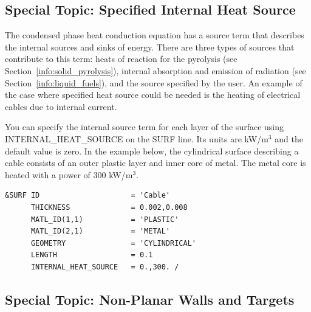 \documentclass[11pt]{book}
\begin{document}
\subsection{Special Topic: Specified Internal Heat Source}

\label{info:INTERNAL_HEAT_SOURCE}

The condensed phase heat conduction equation has a source term that describes the internal sources and sinks of energy.
There are three types of sources that contribute to this term:
heats of reaction for the pyrolysis (see Section~\ref{info:solid_pyrolysis}),
internal absorption and emission of radiation (see Section~\ref{info:liquid_fuels}), and the source specified by the user.
An example of the case where specified heat source could be needed is the heating of electrical cables due to internal current.

You can specify the internal source term for each layer of the surface using {\ct INTERNAL\_HEAT\_SOURCE} on the {\ct SURF} line.
Its units are {\si kW/m$^3$} and the default value is zero.
In the example below, the cylindrical surface describing a cable consists of an outer plastic layer and inner core of metal.
The metal core is heated with a power of 300 {\si kW/m$^3$}.
\begin{lstlisting}
&SURF ID                     = 'Cable'
      THICKNESS              = 0.002,0.008
      MATL_ID(1,1)           = 'PLASTIC'
      MATL_ID(2,1)           = 'METAL'
      GEOMETRY               = 'CYLINDRICAL'
      LENGTH                 = 0.1
      INTERNAL_HEAT_SOURCE   = 0.,300. /
\end{lstlisting}

\subsection{Special Topic: Non-Planar Walls and Targets}

\label{info:GEOMETRY}
\end{document}

